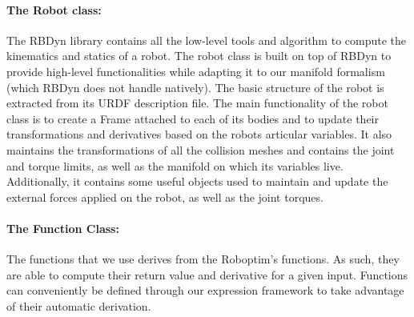 \paragraph{The Robot class:}
The RBDyn library contains all the low-level tools and algorithm to compute the kinematics and statics of a robot.
The robot class is built on top of RBDyn to provide high-level functionalities while adapting it to our manifold formalism (which RBDyn does not handle natively).
The basic structure of the robot is extracted from its URDF description file.
The main functionality of the robot class is to create a Frame attached to each of its bodies and to update their transformations and derivatives based on the robots articular variables.
It also maintains the transformations of all the collision meshes and contains the joint and torque limits, as well as the manifold on which its variables live.
Additionally, it contains some useful objects used to maintain and update the external forces applied on the robot, as well as the joint torques.

\paragraph{The Function Class:}
The functions that we use derives from the Roboptim's functions.
As such, they are able to compute their return value and derivative for a given input.
Functions can conveniently be defined through our expression framework to take advantage of their automatic derivation.

